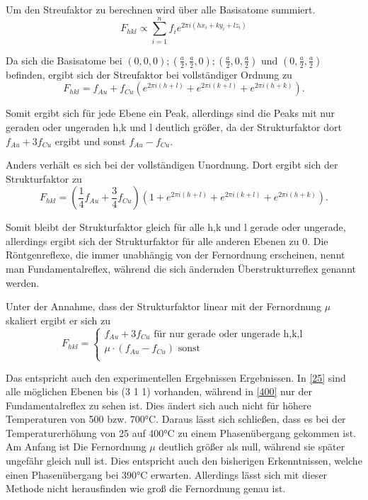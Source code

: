 \documentclass[
	a4paper,
	12pt,
	pagesize,
	ngerman
]{scrartcl}
\begin{document}
Um den Streufaktor zu berechnen wird über alle Basisatome summiert.
\begin{equation}
F_{hkl} \propto \sum_{i=1}^{n} f_{i} e^{2 \pi i(hx_{i} + ky_{i} + lz_{i})}
\end{equation}

Da sich die Basisatome bei $(0,0,0) ; (\frac{a}{2},\frac{a}{2},0) ; (\frac{a}{2},0,\frac{a}{2})$ und $(0, \frac{a}{2}, \frac{a}{2})$ befinden, ergibt sich der Streufaktor bei vollständiger Ordnung zu 
\begin{equation}
F_{hkl} = f_{Au} + f_{Cu} (e^{2 \pi i(h+l)} + e^{2 \pi i(k+l)} + e^{2 \pi i(h+k)}).
\end{equation}

Somit ergibt sich für jede Ebene ein Peak, allerdings sind die Peaks mit nur geraden oder ungeraden h,k und l deutlich größer, da der Strukturfaktor dort $f_{Au} + 3f_{Cu}$ ergibt und sonst $f_{Au} - f_{Cu}$.

Anders verhält es sich bei der vollständigen Unordnung. Dort ergibt sich der Strukturfaktor zu 
\begin{equation}
F_{hkl} = (\frac{1}{4} f_{Au} + \frac{3}{4}f_{Cu}) (1 + e^{2 \pi i(h+l)} + e^{2 \pi i(k+l)} + e^{2 \pi i(h+k)}).
\end{equation}

Somit bleibt der Strukturfaktor gleich für alle h,k und l gerade oder ungerade, allerdings ergibt sich der Strukturfaktor für alle anderen Ebenen zu 0. 
Die Röntgenreflexe, die immer unabhängig von der Fernordnung erscheinen, nennt man Fundamentalreflex, während die sich ändernden Überstrukturreflex genannt werden.

Unter der Annahme, dass der Strukturfaktor linear mit der Fernordnung $\mu$ skaliert ergibt er sich zu
\begin{equation}
F_{hkl} = \left \{ \begin{array}{ll}
f_{Au} + 3f_{Cu} \text{  für nur gerade oder ungerade h,k,l} \\
\mu \cdot (f_{Au} - f_{Cu}) \text{  sonst} \\
\end{array} \right.
\end{equation}

Das entspricht auch den experimentellen Ergebnissen Ergebnissen. In \cref{25} sind alle möglichen Ebenen bis (3 1 1) vorhanden, während in \cref{400} nur der Fundamentalreflex zu sehen ist. Dies ändert sich auch nicht für höhere Temperaturen von 500 bzw. 700°C. 
Daraus lässt sich schließen, dass es bei der Temperaturerhöhung von 25 auf 400°C zu einem Phasenübergang gekommen ist. Am Anfang ist Die Fernordnung $\mu$ deutlich größer als null, während sie später ungefähr gleich null ist. Dies entspricht auch den bisherigen Erkenntnissen, welche einen Phasenübergang bei 390°C erwarten. Allerdings lässt sich mit dieser Methode nicht herausfinden wie groß die Fernordnung genau ist. 
\end{document}

